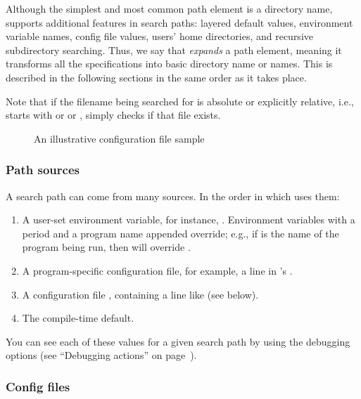 \documentclass{article}
\begin{document}
Although the simplest and most common path element is a directory
name, \KPS{} supports additional features in search paths: layered
default values, environment variable names, config file values, users'
home directories, and recursive subdirectory searching.  Thus, we say
that \KPS{} \emph{expands} a path element, meaning it transforms all
the specifications into basic directory name or names.  This is
described in the following sections in the same order as it takes
place.

Note that if the filename being searched for is absolute or explicitly
relative, i.e., starts with \samp{/} or  or ,
\KPS{} simply checks if that file exists.

\ifSingleColumn
\else
\begin{figure}

\setlength{\abovecaptionskip}{0pt}
  \caption{An illustrative configuration file sample}
  \label{fig:config-sample}
\end{figure}
\fi

\subsubsection{Path sources}
\label{sec:path-sources}

A search path can come from many sources.  In the order in which
\KPS{} uses them:

\begin{enumerate}
\item
  A user-set environment variable, for instance, \@.
  Environment variables with a period and a program name appended
  override; e.g., if  is the name of the program being run,
  then  will override .
\item
  A program-specific configuration file, for exam\-ple, a line
   in 's .
\item   A \KPS{} configuration file , containing a line like
   (see below).
\item The compile-time default.
\end{enumerate}
\noindent You can see each of these values for a given search path by
using the debugging options (see ``Debugging actions'' on
page~\pageref{sec:debugging}).

\subsubsection{Config files}
\label{sec:configfiles}
\end{document}
